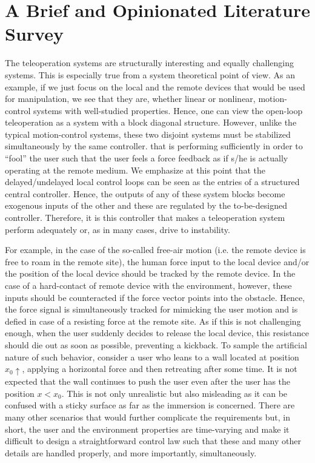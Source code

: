 
\chapter{A Brief and Opinionated Literature Survey}\label{chap:litsurvey}

The teleoperation systems are structurally interesting and equally challenging 
systems. This is especially true from a system theoretical point of view. As an example, 
if we just focus on the local and the remote devices that would be used for manipulation, 
we see that they are, whether linear or nonlinear, motion-control systems with well-studied 
properties. Hence, one can view the open-loop teleoperation as a system with a block 
diagonal structure. However, unlike the typical motion-control systems, these two disjoint systems must be stabilized 
simultaneously by the same controller. that is performing sufficiently in order to \enquote{fool} the user such that the user feels 
a force feedback as if s/he is actually operating at the remote medium. We emphasize at this point that the 
delayed/undelayed local control loops can be seen as the entries of a structured central controller. 
Hence, the outputs of any of these system blocks become exogenous inputs of the other and these are regulated 
by the to-be-designed controller. Therefore, it is this controller that makes a teleoperation system perform 
adequately or, as in many cases, drive to instability.


For example, in the case of the so-called free-air motion (i.e. the remote device is free to roam in the remote site), the human force input 
to the local device and/or the position of the local device should be tracked by the remote device. In the case of a 
hard-contact of remote device with the environment, however, these inputs should be counteracted  if the force vector points into 
the obstacle. Hence, the force signal is simultaneously tracked for mimicking the user motion and  
is defied in case of a resisting force at the remote site. As if this is not challenging enough, 
when the user suddenly decides to release the local device, this resistance should die out as soon as possible, 
preventing a kickback. To sample the artificial nature of such behavior, consider a user who leans to a wall located at 
position $x_0\!\!\uparrow$, applying a horizontal force and then retreating after some time. It is not expected 
that the wall continues to push the user even after the user has the position $x<x_0$. This is not only unrealistic
but also misleading as it can be confused with a sticky surface as far as the immersion is concerned. There are many other 
scenarios that would further complicate the requirements but, in short, the user and the environment properties 
are time-varying and make it difficult to design a straightforward control law such that these and many other details are 
handled properly, and more importantly, simultaneously. 


